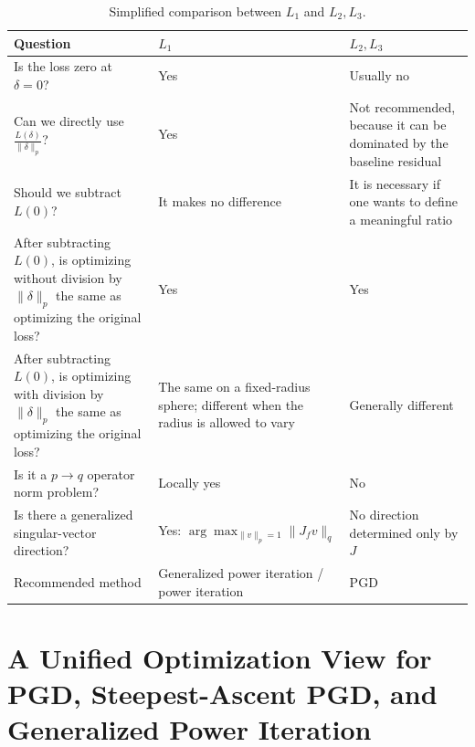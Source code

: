 \documentclass{article}
\renewcommand{\arraystretch}{1.12}
\begin{document}
\clearpage




\begin{table}[htbp]
\centering
\small
\renewcommand{\arraystretch}{1.3}
\setlength{\tabcolsep}{6pt}
\begin{tabular}{p{} p{} p{}}
\hline
\textbf{Question}
&
\textbf{$L_1$}
&
\textbf{$L_2,L_3$}
\\
\hline

Is the loss zero at $\delta=0$?
&
Yes
&
Usually no
\\

Can we directly use $\displaystyle \frac{L(\delta)}{\|\delta\|_p}$?
&
Yes
&
Not recommended, because it can be dominated by the baseline residual
\\

Should we subtract $L(0)$?
&
It makes no difference
&
It is necessary if one wants to define a meaningful ratio
\\

After subtracting $L(0)$, is optimizing without division by $\|\delta\|_p$ the same as optimizing the original loss?
&
Yes
&
Yes
\\

After subtracting $L(0)$, is optimizing with division by $\|\delta\|_p$ the same as optimizing the original loss?
&
The same on a fixed-radius sphere; different when the radius is allowed to vary
&
Generally different
\\

Is it a $p\to q$ operator norm problem?
&
Locally yes
&
No
\\

Is there a generalized singular-vector direction?
&
Yes: 
$\displaystyle \arg\max_{\|v\|_p=1}\|J_fv\|_q$
&
No direction determined only by $J$
\\

Recommended method
&
Generalized power iteration / power iteration
&
PGD
\\

\hline
\end{tabular}
\caption{Simplified comparison between $L_1$ and $L_2,L_3$.}
\label{tab:simplified_loss_comparison}
\end{table}

\section{A Unified Optimization View for PGD, Steepest-Ascent PGD, and Generalized Power Iteration}
\end{document}
